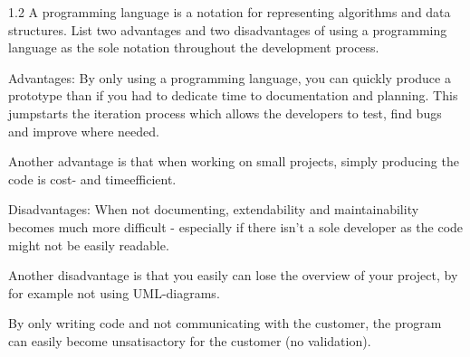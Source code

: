 1.2 
A programming language is a notation for representing algorithms and data structures. List two advantages and two disadvantages of using a programming language as the sole notation throughout the development process.

Advantages:		By only using a programming language, you can quickly produce a prototype than if you had to dedicate time to documentation and planning. 
				This jumpstarts the iteration process which allows the developers to test, find bugs and improve where needed.

				Another advantage is that when working on small projects, simply producing the code is cost- and timeefficient. 

Disadvantages:	When not documenting, extendability and maintainability becomes much more difficult - especially if there isn't a sole developer as the code might not be easily readable.

Another disadvantage is that you easily can lose the overview of your project, by for example not using UML-diagrams. 

By only writing code and not communicating with the customer, the program can easily become unsatisactory for the customer (no validation).